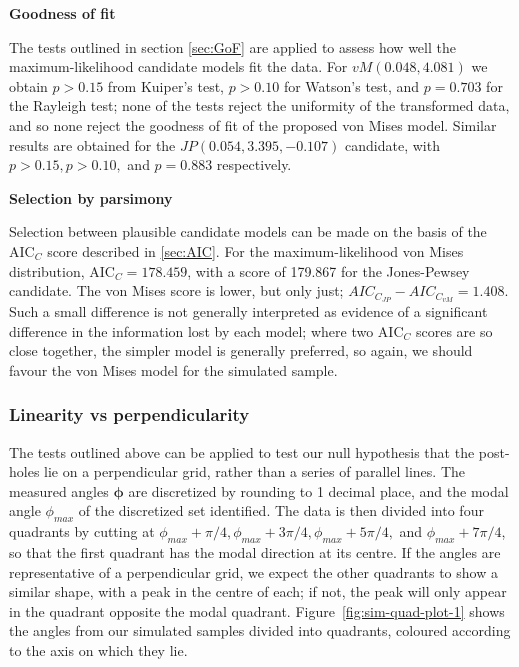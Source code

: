 \documentclass[../../ArchStats.tex]{subfiles}
\begin{document}
\textbf{Goodness of fit}

The tests outlined in section \ref{sec:GoF} are applied to assess how well the maximum-likelihood candidate models fit the data. For $vM(0.048, 4.081)$ we obtain $p > 0.15$ from Kuiper's test, $p > 0.10$ for Watson's test, and $p = 0.703$ for the Rayleigh test; none of the tests reject the uniformity of the transformed data, and so none reject the goodness of fit of the proposed von Mises model. Similar results are obtained for the $JP(0.054, 3.395, -0.107)$ candidate, with $p > 0.15, p > 0.10,$ and $p=0.883$ respectively.

\textbf{Selection by parsimony}

Selection between plausible candidate models can be made on the basis of the AIC$_C$ score described in \ref{sec:AIC}. For the maximum-likelihood von Mises distribution, AIC$_C = 178.459$, with a score of 179.867 for the Jones-Pewsey candidate. The von Mises score is lower, but only just; $AIC_{C_{JP}} - AIC_{C_{vM}}  = 1.408$. Such a small difference is not generally interpreted as evidence of a significant difference in the information lost by each model; where two AIC$_C$ scores are so close together, the simpler model is generally preferred, so again, we should favour the von Mises model for the simulated sample.


\subsubsection{Linearity vs perpendicularity}
\label{sssec:perpendicularity}
The tests outlined above can be applied to test our null hypothesis that the post-holes lie on a perpendicular grid, rather than a series of parallel lines. The measured angles $\boldsymbol{\phi}$ are discretized by rounding to 1 decimal place, and the modal angle $\phi_{max}$ of the discretized set identified. The data is then divided into four quadrants by cutting at $\phi_{max} + \pi/4, \phi_{max} + 3\pi/4, \phi_{max} + 5\pi/4,$ and $\phi_{max} + 7\pi/4$, so that the first quadrant has the modal direction at its centre. If the angles are representative of a perpendicular grid, we expect the other quadrants to show a similar shape, with a peak in the centre of each; if not, the peak will only appear in the quadrant opposite the modal quadrant. Figure~\ref{fig:sim-quad-plot-1} shows the angles from our simulated samples divided into quadrants, coloured according to the axis on which they lie.
\end{document}
